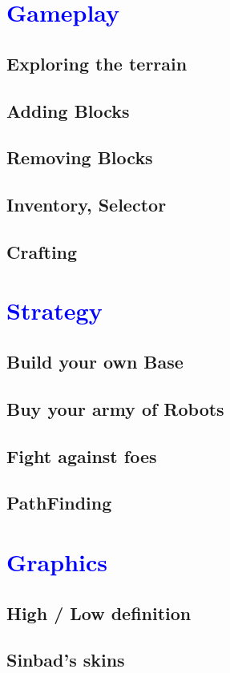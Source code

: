 \documentclass[article]{report}         %
\begin{document}
    \chapter{\textcolor{blue}{Gameplay}}
      \section{Exploring the terrain}
      \section{Adding Blocks}
      \section{Removing Blocks}
      \section{Inventory, Selector}
      \section{Crafting}
    \chapter{\textcolor{blue}{Strategy}}
      \section{Build your own Base}
      \section{Buy your army of Robots}
      \section{Fight against foes}
      \section{PathFinding}
    \chapter{\textcolor{blue}{Graphics}}
      \section{High / Low definition}
      \section{Sinbad's skins}
\end{document}
